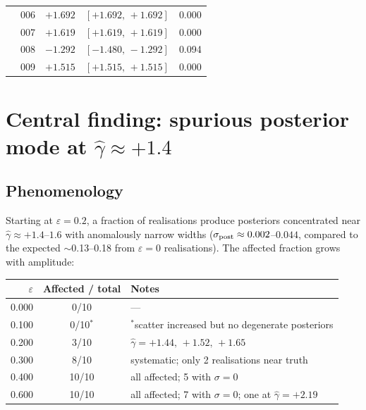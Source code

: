 \documentclass[11pt,a4paper]{article}
\begin{document}
\begin{table}[h]
\begin{tabular}{r l r@{\,}l r}
 & \textcolor{warnred}{006} & \textcolor{warnred}{$+1.692$} & \textcolor{warnred}{$[+1.692,\,+1.692]$} & \textcolor{warnred}{0.000} \\
 & \textcolor{warnred}{007} & \textcolor{warnred}{$+1.619$} & \textcolor{warnred}{$[+1.619,\,+1.619]$} & \textcolor{warnred}{0.000} \\
 & \textcolor{warnred}{008} & \textcolor{warnred}{$-1.292$} & \textcolor{warnred}{$[-1.480,\,-1.292]$} & \textcolor{warnred}{0.094} \\
 & \textcolor{warnred}{009} & \textcolor{warnred}{$+1.515$} & \textcolor{warnred}{$[+1.515,\,+1.515]$} & \textcolor{warnred}{0.000} \\
\bottomrule
\end{tabular}
\end{table}

\section{Central finding: spurious posterior mode at $\hat\gamma \approx +1.4$}

\subsection{Phenomenology}

Starting at $\varepsilon = 0.2$, a fraction of realisations produce posteriors
concentrated near $\hat\gamma \approx +1.4$--$1.6$ with anomalously narrow
widths ($\sigma_{\rm post} \approx 0.002$--$0.044$, compared to the expected
$\sim$0.13--0.18 from $\varepsilon=0$ realisations).
The affected fraction grows with amplitude:

\begin{center}
\begin{tabular}{r c l}
\toprule
$\varepsilon$ & Affected / total & Notes \\
\midrule
0.000 & 0/10 & — \\
0.100 & 0/10$^*$ & $^*$scatter increased but no degenerate posteriors \\
0.200 & 3/10 & $\hat\gamma = +1.44,\,+1.52,\,+1.65$ \\
0.300 & 8/10 & systematic; only 2 realisations near truth \\
0.400 & 10/10 & all affected; 5 with $\sigma=0$ \\
0.600 & 10/10 & all affected; 7 with $\sigma=0$; one at $\hat\gamma=+2.19$ \\
\bottomrule
\end{tabular}
\end{center}
\end{document}
